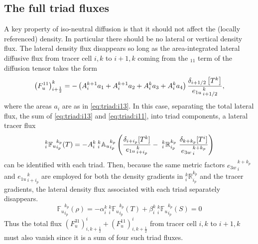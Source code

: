 \documentclass[NEMO_book]{subfiles}
\begin{document}
\subsection{The full triad fluxes}
A key property of iso-neutral diffusion is that it should not affect
the (locally referenced) density. In particular there should be no
lateral or vertical density flux. The lateral density flux disappears so long as the
area-integrated lateral diffusive flux from tracer cell $i,k$ to
$i+1,k$ coming from the $_{11}$ term of the diffusion tensor takes the
form
\begin{equation}
  \label{eq:triad:i11}
  \left( F_u^{11} \right) _{i+\frac{1}{2}} ^{k} =
  - \left( {A}_i^{k+1} a_{1} + {A}_i^{k+1} a_{2} + {A}_i^k
    a_{3} + {A}_i^k a_{4} \right)
  \frac{\delta _{i+1/2} \left[ T^k\right]}{{e_{1u}}_{\,i+1/2}^{\,k}},
\end{equation}
where the areas $a_i$ are as in \eqref{eq:triad:i13}. In this case,
separating the total lateral flux, the sum of \eqref{eq:triad:i13} and
\eqref{eq:triad:i11}, into triad components, a lateral tracer
flux
\begin{equation}
  \label{eq:triad:latflux-triad}
  _i^k {\mathbb{F}_u}_{i_p}^{k_p} (T) = - {A}_i^k{ \:}_i^k{\mathbb{A}_u}_{i_p}^{k_p}
  \left(
    \frac{ \delta_{i+ i_p}[T^k] }{ {e_{1u}}_{\,i + i_p}^{\,k} }
    -\ {_i^k\mathbb{R}_{i_p}^{k_p}} \
    \frac{ \delta_{k+k_p} [T^i] }{{e_{3w}}_{\,i}^{\,k+k_p} }
  \right)
\end{equation}
can be identified with each triad. Then, because the
same metric factors ${e_{3w}}_{\,i}^{\,k+k_p}$ and
${e_{1u}}_{\,i+i_p}^{\,k}$ are employed for both the density gradients
in $ _i^k \mathbb{R}_{i_p}^{k_p}$ and the tracer gradients, the lateral
density flux associated with each triad separately disappears.
\begin{equation}
  \label{eq:triad:latflux-rho}
  {\mathbb{F}_u}_{i_p}^{k_p} (\rho)=-\alpha _i^k {\:}_i^k {\mathbb{F}_u}_{i_p}^{k_p} (T) + \beta_i^k {\:}_i^k {\mathbb{F}_u}_{i_p}^{k_p} (S)=0
\end{equation}
Thus the total flux $\left( F_u^{31} \right) ^i _{i,k+\frac{1}{2}} +
\left( F_u^{11} \right) ^i _{i,k+\frac{1}{2}}$ from tracer cell $i,k$
to $i+1,k$ must also vanish since it is a sum of four such triad fluxes.
\end{document}
